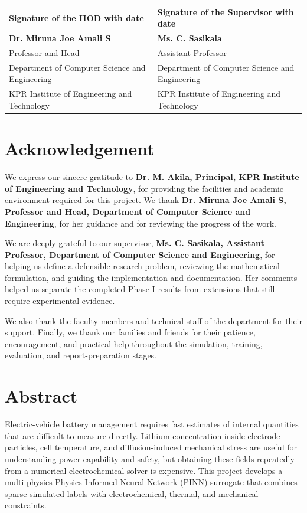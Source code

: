 \documentclass[14pt,a4paper,oneside]{extreport}
\begin{document}
\vspace{3.0cm}
\noindent
\begin{tabularx}{\textwidth}{X X}
\textbf{Signature of the HOD with date} & \textbf{Signature of the Supervisor with date}\\[1.4cm]
\textbf{Dr. Miruna Joe Amali S} & \textbf{Ms. C. Sasikala}\\
Professor and Head & Assistant Professor\\
Department of Computer Science and Engineering & Department of Computer Science and Engineering\\
KPR Institute of Engineering and Technology & KPR Institute of Engineering and Technology
\end{tabularx}

\clearpage
\chapter*{Acknowledgement}
We express our sincere gratitude to \textbf{Dr. M. Akila, Principal, KPR Institute of Engineering and Technology}, for providing the facilities and academic environment required for this project. We thank \textbf{Dr. Miruna Joe Amali S, Professor and Head, Department of Computer Science and Engineering}, for her guidance and for reviewing the progress of the work.

We are deeply grateful to our supervisor, \textbf{Ms. C. Sasikala, Assistant Professor, Department of Computer Science and Engineering}, for helping us define a defensible research problem, reviewing the mathematical formulation, and guiding the implementation and documentation. Her comments helped us separate the completed Phase I results from extensions that still require experimental evidence.

We also thank the faculty members and technical staff of the department for their support. Finally, we thank our families and friends for their patience, encouragement, and practical help throughout the simulation, training, evaluation, and report-preparation stages.

\clearpage
\chapter*{Abstract}
Electric-vehicle battery management requires fast estimates of internal quantities that are difficult to measure directly. Lithium concentration inside electrode particles, cell temperature, and diffusion-induced mechanical stress are useful for understanding power capability and safety, but obtaining these fields repeatedly from a numerical electrochemical solver is expensive. This project develops a multi-physics Physics-Informed Neural Network (PINN) surrogate that combines sparse simulated labels with electrochemical, thermal, and mechanical constraints.
\end{document}

